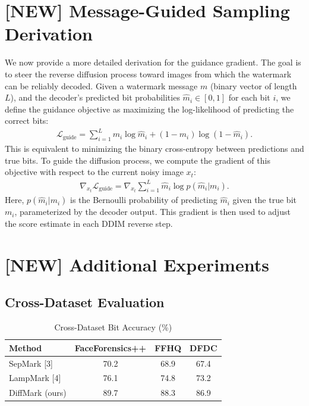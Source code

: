 \documentclass{article}
\begin{document}
\section{[NEW] Message-Guided Sampling Derivation}
We now provide a more detailed derivation for the guidance gradient. The goal is to steer the reverse diffusion process toward images from which the watermark can be reliably decoded. Given a watermark message $m$ (binary vector of length $L$), and the decoder's predicted bit probabilities $\hat{m}_i \in [0,1]$ for each bit $i$, we define the guidance objective as maximizing the log-likelihood of predicting the correct bits:
\begin{align}
\mathcal{L}_{\text{guide}} = \sum_{i=1}^L m_i \log \hat{m}_i + (1-m_i) \log (1-\hat{m}_i).
\end{align}
This is equivalent to minimizing the binary cross-entropy between predictions and true bits. To guide the diffusion process, we compute the gradient of this objective with respect to the current noisy image $x_t$:
\begin{align}
\nabla_{x_t} \mathcal{L}_{\text{guide}} = \nabla_{x_t} \sum_{i=1}^L \hat{m}_i \log p(\hat{m}_i | m_i).
\end{align}
Here, $p(\hat{m}_i | m_i)$ is the Bernoulli probability of predicting $\hat{m}_i$ given the true bit $m_i$, parameterized by the decoder output. This gradient is then used to adjust the score estimate in each DDIM reverse step.

\section{[NEW] Additional Experiments}
\subsection{Cross-Dataset Evaluation}
\begin{table}[h]
\centering
\caption{Cross-Dataset Bit Accuracy (\%)}
\begin{tabular}{lccc}
\toprule
Method & FaceForensics++ & FFHQ & DFDC \\
\midrule
SepMark [3] & 70.2 & 68.9 & 67.4 \\
LampMark [4] & 76.1 & 74.8 & 73.2 \\
DiffMark (ours) & 89.7 & 88.3 & 86.9 \\
\bottomrule
\end{tabular}
\end{table}
\end{document}
